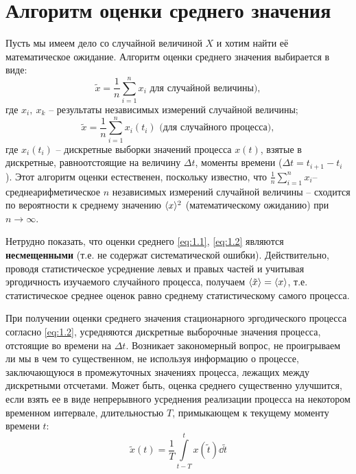\documentclass[a4paper,14pt]{extarticle}
\begin{document}
\section{Алгоритм оценки среднего значения}%
\label{sec:algoritm_otsenki_srednego_znacheniia}
Пусть мы имеем дело со случайной величиной $X$ и хотим найти её математическое ожидание.
Алгоритм оценки среднего значения выбирается в виде:
\begin{equation}
    \label{eq:1.1}
    \tilde x = \frac{1}{n} \sum\limits_{i=1}^{n} x_i \text{ для случайной величины)},
\end{equation}
где $x_i,~x_k$ -- результаты независимых измерений случайной величины;
\begin{equation}
    \label{eq:1.2}
    \tilde x = \frac{1}{n} \sum\limits_{i=1}^{n} x_i(t_i) \text{ (для случайного процесса)},
\end{equation}
где $x_i(t_i)$ -- дискретные выборки значений процесса $x(t)$, взятые в дискретные,
равноотстоящие на величину $\Delta t$, моменты времени ($\Delta t = t_{i+1}-t_i$ ).
Этот алгоритм оценки естественен, поскольку известно, что $\frac{1}{n} \sum\limits_{i=1}^{n} x_i$-- среднеарифметическое $n$ независимых измерений случайной
величины -- сходится по вероятности к среднему значению $\langle x\rangle^2$ (математическому
ожиданию) при $n \to \infty $.

Нетрудно показать, что оценки среднего \eqref{eq:1.1}, \eqref{eq:1.2}  являются
\textbf{несмещенными} (т.е. не содержат систематической ошибки). Действительно, проводя
статистическое усреднение левых и правых частей и учитывая эргодичность изучаемого
случайного процесса, получаем $\langle\tilde x\rangle = \langle x\rangle$, т.е. статистическое среднее оценок равно среднему
статистическому самого процесса.

При получении оценки среднего значения стационарного эргодического процесса согласно 
\eqref{eq:1.2}, усредняются дискретные выборочные значения процесса, отстоящие во времени 
на $\Delta t$. Возникает закономерный вопрос, не проигрываем ли мы в чем то существенном,
не используя информацию о процессе, заключающуюся в промежуточных значениях процесса,
лежащих между дискретными отсчетами. Может быть, оценка среднего существенно улучшится,
если взять ее в виде непрерывного усреднения реализации процесса на некотором временном 
интервале, длительностью $T$, примыкающем к текущему моменту времени $t$:
\begin{equation}
    \label{eq:1.3}
    \tilde x(t) = \frac{1}{T} \int\limits_{t-T}^{t} x(\tilde t) \dd{\tilde t} 
\end{equation}
\end{document}
